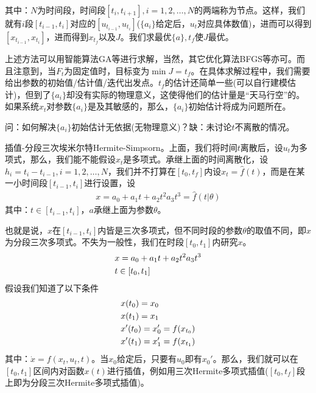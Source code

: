             其中：$N$为时间段，时间段$[t_i,t_{i+1}],i=1,2,\dots,N$的两端称为节点。这样，我们就有$i$段$[t_{i-1},t_i]$对应的$[u_{t_{i-1}},u_{t_i}]$($\{a_i\}$给定后，$u_t$对应具体数值)，进而可以得到$[x_{t_{i-1}},x_{t_i}]$，进而得到$x_{t_f}$以及$J$。我们求最优$\{a\},t_f$使$J$最优。
            \par
            上述方法可以用智能算法GA等进行求解，当然，其它优化算法BFGS等亦可。而且注意到，当$F_t$为固定值时，目标变为$\min J = t_f$。在具体求解过程中，我们需要给出参数的初始值/估计值/迭代出发点。$t_f$的估计还简单一些(可以自行建模估计)，但到了$\{a_i\}$却没有实际的物理意义，这使得他们的估计量是“天马行空”的。如果系统$x_t$对参数$\{a_i\}$是及其敏感的，那么，$\{a_i\}$初始估计将成为问题所在。
            \par
            问：如何解决$\{a_i\}$初始估计无依据(无物理意义)？缺：未讨论$t$不离散的情况。
            \par
            插值-分段三次埃米尔特Hermite-Simpsorn。上面，我们将时间$t$离散后，设$u_t$为多项式，那么，我们能不能假设$x_t$是多项式。承继上面的时间离散化，设$h_i=t_i-t_{i-1},i=1,2,\dots,N$，我们并不打算在$[t_0,t_f]$内设$x_t = \hat{f}(t)$，而是在某一小时间段$[t_{i-1},t_i]$进行设置，设
            \begin{align*}
            x = a_0+a_1t+a_2t^2a_3t^3 = \hat{f}(t|\theta)
            \end{align*}
            其中：$t \in [t_{i-1},t_i]$，$a$承继上面为参数$\theta$。
            \par
            也就是说，$x$在$[t_{i-1},t_i]$内皆是三次多项式，但不同时段的参数$\theta$的取值不同，即$x$为分段三次多项式。不失为一般性，我们在时段$[t_0,t_1]$内研究$x$。
            \begin{align}
            \label{直接法：三次多项式}
            & x = a_0+a_1t+a_2t^2a_3t^3 \\
            & t\in [t_0,t_1]\notag
            \end{align}
            假设我们知道了以下条件
            \begin{align}
            \label{4个已知条件}
            & x(t_0) = x_0\notag\\
            & x(t_1) = x_1\notag\\
            & x'(t_0) = x_0' = f(x_{t_0})\notag\\
            & x'(t_1) = x_1' = f(x_{t_1})
            \end{align}
            其中：$\dot{x} = f(x_t,u_t,t)$。当$x_0$给定后，只要有$u_0$即有$x_0'$。那么，我们就可以在$[t_0,t_1]$区间内对函数$x(t)$进行插值，例如用三次Hermite多项式插值($[t_0,t_f]$段上即为分段三次Hermite多项式插值)。
